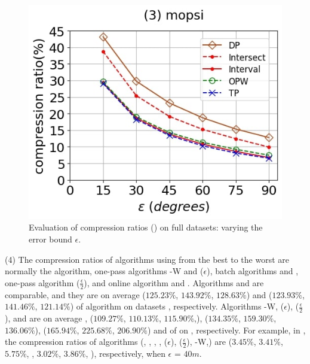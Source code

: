 \begin{figure}[tb!]
	\includegraphics[scale=0.250]{Figures/Exp-DAD-CR-epsilon-mopsi.jpg}		
	\vspace{-2ex}
	\caption{\small Evaluation of compression ratios (\dad) on full datasets: varying the error bound $\epsilon$.}
	\label{fig:cr-dad-epsilon}
	\vspace{-2ex}
\end{figure}

\sstab(4) The compression ratios of algorithms using \sed from the best
to the worst are normally the \opt algorithm, one-pass algorithms {\cised-W} and \cised($\epsilon$), batch algorithms \tpa and
\dpa, one-pass algorithm \cised($\frac{\epsilon}{2}$), and online algorithm {\dagots} and \squishe.
%
{Algorithms \tpa and \dpa are comparable, and they are on average
($125.23\%$, $143.92\%$, $128.63\%$) and ($123.93\%$, $141.46\%$, $121.14\%$)
 of algorithm \opt on datasets \dSets, respectively.}
%
{Algorithms {\cised-W}, \cised(${\epsilon}$), \cised($\frac{\epsilon}{2}$), \squishe and {\dagots} are on average , ($109.27\%$, $110.13\%$, $115.90\%$,), ($134.35\%$, $159.30\%$, $136.06\%$), ($165.94\%$, $225.68\%$, $206.90\%$) and 
 of \opt on \dSets, respectively.}
%
For example, in \mopsi, the compression ratios of algorithms
(\tpa, \dpa, \squishe, {\dagots}, \cised(${\epsilon}$), \cised($\frac{\epsilon}{2}$),  {\cised-W},)
are ($3.45\%$, $3.41\%$, $5.75\%$, , $3.02\%$, $3.86\%$,  ), respectively, when $\epsilon$ = $40m$.
%
%
%

